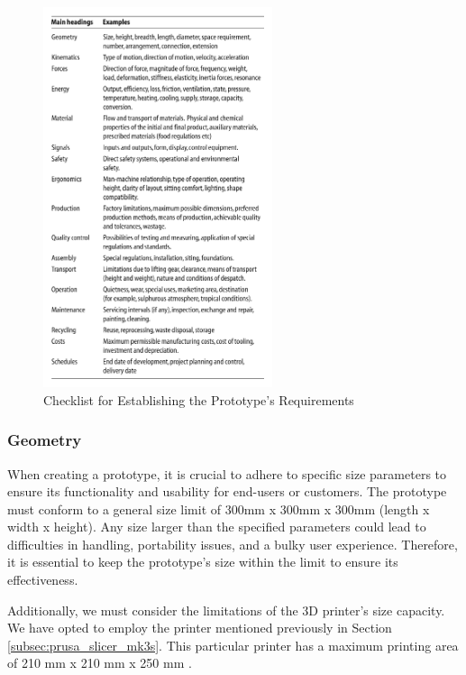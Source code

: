 \begin{figure}[ht!]
    \centering
    \includegraphics[width=0.6\textwidth]{texs/Part1/chapter2/image/requirements.png}
    \caption{Checklist for Establishing the Prototype's Requirements \cite[149]{Pahl2007}}
    \label{fig:checklist}
\end{figure}

\subsubsection{Geometry}
When creating a prototype, it is crucial to adhere to specific size parameters to ensure its functionality and usability for end-users or customers. The prototype must conform to a general size limit of 300mm x 300mm x 300mm (length x width x height). Any size larger than the specified parameters could lead to difficulties in handling, portability issues, and a bulky user experience. Therefore, it is essential to keep the prototype's size within the limit to ensure its effectiveness.

Additionally, we must consider the limitations of the 3D printer's size capacity. We have opted to employ the printer mentioned previously in Section \ref{subsec:prusa_slicer_mk3s}. This particular printer has a maximum printing area of 210 mm x 210 mm x 250 mm \cite{Prusa}.

